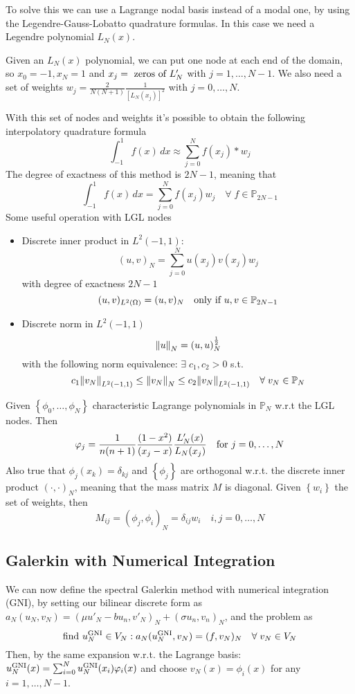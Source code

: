 To solve this we can use a Lagrange nodal basis instead of a modal one, by using the Legendre-Gauss-Lobatto quadrature formulas.
In this case we need a Legendre polynomial \(L_N(x)\).

Given an \(L_N(x)\) polynomial, we can put one node at each end of the domain, so \(x_0 = -1, x_N =  1\) and \(x_j = \text{ zeros of }L'
_N\) with \(j =  1, \ldots, N-1\). We also need a set of weights \(w_j = \frac{2}{N(N+1)} \frac{1}{[L_N(x_j)]^2}\) with \(j = 0, \ldots, N\).

With this set of nodes and weights it's possible to obtain the following interpolatory quadrature formula
\[
    \int_{-1}^1 f(x) \, dx \approx \sum_{j=0}^{N} f(x_j)*w_j
\]
The degree of exactness of this method is \(2N-1\), meaning that 
\[
    \int_{-1}^1 f(x)\,dx = \sum_{j=0}^{N} f(x_j)w_j \quad \forall \; f \in \mathbb{P}_{2N-1}
\]
Some useful operation with LGL nodes
\begin{itemize}
    \item Discrete inner product in \(L^2(-1,1)\):
    \[
        (u,v)_N = \sum_{j=0}^{N} u(x_j)v(x_j)w_j 
    \]
    with degree of exactness \(2N-1\) 
    \[
        (u,v)_{L^2(\Omega)} = (u,v)_N \quad \text{only if } u, v \in \mathbb{P}_{2N-1}
    \]
    \item Discrete norm in \(L^2(-1,1)\)
    \[
        \norm{u}_N = (u,u)_N^{\frac{1}{2}}
    \]
    with the following norm equivalence: \(\exists \; c_1, c_2 > 0\) s.t.
    \[
        c_1 \norm{v_N}_{L^2(-1,1)} \leq \norm{v_N}_N \leq c_2 \norm{v_N}_{L^2(-1,1)} \quad \forall \; v_N \in \mathbb{P}_N
    \]
\end{itemize}
Given \(\left\{\phi_0, \ldots, \phi_N\right\}\) characteristic Lagrange polynomials in \(\mathbb{P}_N\) w.r.t the LGL nodes. Then
\[
    \varphi_j = \frac{1}{n(n+1)} \frac{(1-x^2)}{(x_j-x)}\frac{L'_N(x)}{L_N(x_j)} \quad \text{for } j = 0, \ldots, N
\]
Also true that \(\phi_j(x_k) = \delta_{kj}\) and \(\left\{\phi_j\right\}\) are orthogonal w.r.t. the discrete inner product \((\cdot,\cdot)_N\), meaning that the mass matrix \(M\) is diagonal. Given \(\left\{w_i\right\}\) the set of weights, then 
\[
    M_{ij} = (\phi_j, \phi_i)_N = \delta_{ij}w_i  \quad i,j  = 0, \ldots, N
\]
\subsection{Galerkin with Numerical Integration}
We can now define the spectral Galerkin method with numerical integration (GNI), by setting our bilinear discrete form as \(a_N(u_N, v_N) = (\mu u'_N-b u_n, v'_N)_N+(\sigma u_n, v_n)_N\), and the problem as
\[
    \text{find } u_N^{\text{GNI}} \in V_N : a_N(u_N^{\text{GNI}},v_N)=(f, v_N)_N \quad \forall \; v_N \in V_N
\]
Then, by the same expansion w.r.t. the Lagrange basis: \(u_N^{\text{GNI}}(x) =  \sum_{i=0}^{N}u_N^{\text{GNI}}(x_i)\varphi_i(x)\) and choose \(v_N(x) = \phi_i(x)\) for any \(i = 1, \ldots, N-1\).  

